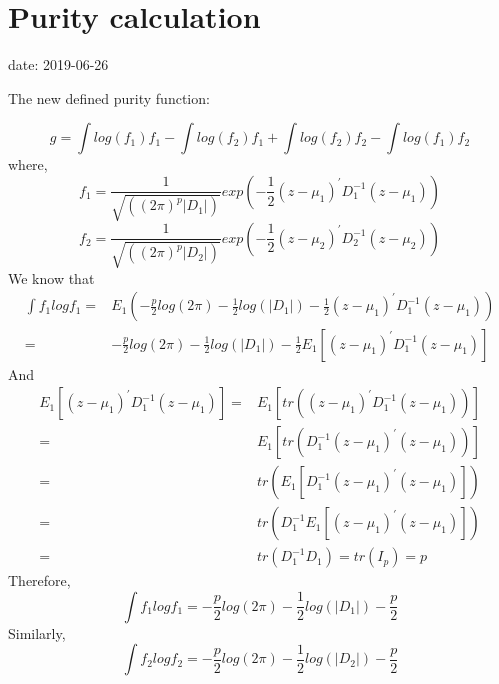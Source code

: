 \documentclass[12pt]{article}
\begin{document}
\section* {Purity calculation}

date: 2019-06-26

\bigskip


The new defined purity function: 

$$g = \int log(f_1) f_1 - \int log(f_2) f_1 + \int log(f_2) f_2 - \int log(f_1) f_2$$
where, 
$$f_1 = \frac{1}{\sqrt{( (2\pi)^p |D_1|)}} exp(-\frac{1}{2} (z - \mu_1)^{\prime} D_1^{-1}(z - \mu_1))$$
$$f_2 = \frac{1}{\sqrt{( (2\pi)^p |D_2|)}} exp(-\frac{1}{2} (z - \mu_2)^{\prime} D_2^{-1}(z - \mu_2))$$
We know that
$$\begin{aligned}
\int f_1 log f_1 =& E_1(-\frac{p}{2} log(2\pi) - \frac{1}{2}log(|D_1|) -\frac{1}{2}(z - \mu_1)^{\prime} D_1^{-1}(z - \mu_1)) \\
=&-\frac{p}{2} log(2\pi) - \frac{1}{2}log(|D_1|) -\frac{1}{2}E_1[(z - \mu_1)^{\prime} D_1^{-1}(z - \mu_1)]
\end{aligned}$$
And 
$$\begin{aligned}
E_1[(z - \mu_1)^{\prime} D_1^{-1}(z - \mu_1)] =& E_1[tr((z - \mu_1)^{\prime} D_1^{-1}(z - \mu_1))]  \\
=& E_1[tr(D_1^{-1}(z - \mu_1)^{\prime}(z - \mu_1))] \\
=& tr( E_1[D_1^{-1}(z - \mu_1)^{\prime}(z - \mu_1)]) \\
=& tr(D_1^{-1} E_1[(z - \mu_1)^{\prime}(z - \mu_1)]) \\
=& tr(D_1^{-1} D_1) = tr(I_{p}) = p
\end{aligned}$$
Therefore, 
$$\int f_1 log f_1 =-\frac{p}{2} log(2\pi) - \frac{1}{2}log(|D_1|) -\frac{p}{2}$$
Similarly,
$$\int f_2 log f_2 =-\frac{p}{2} log(2\pi) - \frac{1}{2}log(|D_2|) -\frac{p}{2}$$
\end{document}
